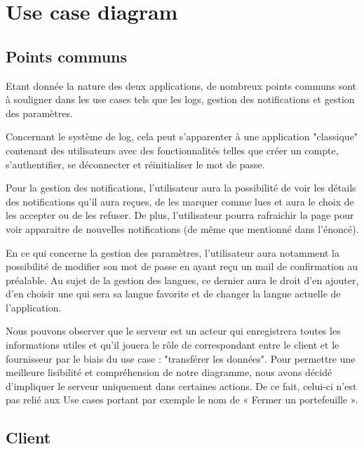 \section{Use case diagram}
\subsection{Points communs}
	Etant donnée la nature des deux applications, de nombreux points communs sont à souligner dans les use cases tels que les logs, gestion des notifications et gestion des paramètres.
\newline
\newline

Concernant le système de log, cela peut s'apparenter à une application "classique" contenant des utilisateurs avec des fonctionnalités telles que créer un compte, s’authentifier, se déconnecter et réinitialiser le mot de passe.
\newline
\newline

Pour la gestion des notifications, l'utilisateur aura la possibilité de voir les détails des notifications qu'il aura reçues, de les marquer comme lues et aura le choix de les accepter ou de les refuser. De plus, l'utilisateur pourra rafraichir la page pour voir apparaitre de nouvelles notifications (de même que mentionné dans l'énoncé).
\newline
\newline

En ce qui concerne la gestion des paramètres, l’utilisateur aura notamment la possibilité de modifier son mot de passe en ayant reçu un mail de confirmation au préalable.  Au sujet de la gestion des langues, ce dernier aura le droit d'en ajouter, d'en choisir une qui sera sa langue favorite et de changer la langue actuelle de l'application.
\newline
\newline

Nous pouvons observer que le serveur est un acteur qui enregistrera toutes les informations utiles et qu’il jouera le rôle de correspondant entre le client et le fournisseur par le biais du use case : "transférer les données".
Pour permettre une meilleure lisibilité et compréhension de notre diagramme, nous avons décidé d’impliquer le serveur uniquement dans certaines actions. De ce fait, celui-ci n’est pas relié aux Use cases portant par exemple le nom de « Fermer un portefeuille ».

\newpage
\subsection{Client}

